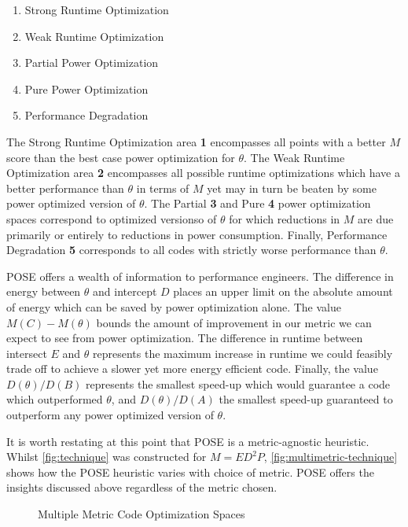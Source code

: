 \begin{enumerate}
\item Strong Runtime Optimization
\item Weak Runtime Optimization
\item Partial Power Optimization
\item Pure Power Optimization
\item Performance Degradation
\end{enumerate}

The Strong Runtime Optimization area \textbf{1} encompasses all points with a better $M$ score than the best case power optimization for $\theta$. The Weak Runtime Optimization area \textbf{2} encompasses all possible runtime optimizations which have a better performance than $\theta$ in terms of $M$ yet may in turn be beaten by some power optimized version of $\theta$. The Partial \textbf{3} and Pure \textbf{4} power optimization spaces correspond to optimized versionso of $\theta$ for which reductions in $M$ are due primarily or entirely to reductions in power consumption.
Finally, Performance Degradation \textbf{5} corresponds to all codes with strictly worse performance than $\theta$.


POSE offers a wealth of information to performance engineers.
The difference in energy between $\theta$ and intercept $D$ places an upper limit on the absolute amount of energy which can be saved by power optimization alone.
The value $M(C) - M(\theta)$ bounds the amount of improvement in our metric we can expect to see from power optimization.
The difference in runtime between intersect $E$ and $\theta$ represents the maximum increase in runtime we could feasibly trade off to achieve a slower yet more energy efficient code.
Finally, the value $D(\theta) / D(B)$ represents the smallest speed-up which would guarantee a code which outperformed $\theta$, and $D(\theta) / D(A)$ the smallest speed-up guaranteed to outperform any power optimized version of $\theta$.

It is worth restating at this point that POSE is a metric-agnostic heuristic. Whilst \autoref{fig:technique} was constructed for $M=ED^2P$, \autoref{fig:multimetric-technique} shows how the POSE heuristic varies with choice of metric. POSE offers the insights discussed above regardless of the metric chosen.

\begin{figure}
\centering

\caption{Multiple Metric Code Optimization Spaces}
\label{fig:multimetric-technique}
\end{figure}
